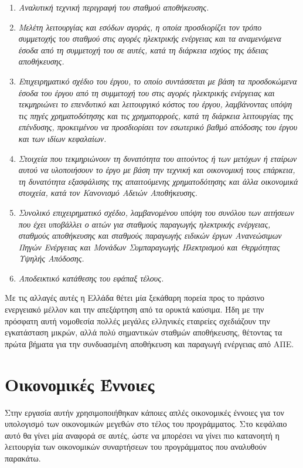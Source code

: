 \documentclass[12pt]{report}
\begin{document}
\begin{enumerate}[label=\roman*.]
	\item {\textit{Αναλυτική τεχνική περιγραφή του σταθμού αποθήκευσης.}}
	\item {\textit{Μελέτη λειτουργίας και εσόδων αγοράς, η οποία προσδιορίζει τον τρόπο συμμετοχής του σταθμού στις αγορές ηλεκτρικής ενέργειας και τα αναμενόμενα έσοδα από τη συμμετοχή του σε αυτές, 
				κατά τη διάρκεια ισχύος της άδειας αποθήκευσης.}}
	\item {\textit{Επιχειρηματικό σχέδιο του έργου, το οποίο συντάσσεται με βάση τα προσδοκώμενα έσοδα του έργου από τη συμμετοχή του στις αγορές ηλεκτρικής ενέργειας και τεκμηριώνει το επενδυτικό και λειτουργικό κόστος του έργου, 
				λαμβάνοντας υπόψη τις πηγές χρηματοδότησης και τις χρηματορροές, κατά τη διάρκεια λειτουργίας της επένδυσης, προκειμένου να προσδιορίσει τον εσωτερικό βαθμό απόδοσης του έργου και των ιδίων κεφαλαίων.}}
	\item {\textit{Στοιχεία που τεκμηριώνουν τη δυνατότητα του αιτούντος ή των μετόχων ή εταίρων αυτού να υλοποιήσουν το έργο με βάση την τεχνική και οικονομική τους επάρκεια, τη δυνατότητα εξασφάλισης της απαιτούμενης χρηματοδότησης 
				και άλλα οικονομικά στοιχεία, κατά τον Κανονισμό Αδειών Αποθήκευσης.}}
	\item {\textit{Συνολικό επιχειρηματικό σχέδιο, λαμβανομένου υπόψη του συνόλου των αιτήσεων που έχει υποβάλλει ο αιτών για σταθμούς παραγωγής ηλεκτρικής ενέργειας, σταθμούς αποθήκευσης και σταθμούς παραγωγής ειδικών έργων 
				Ανανεώσιμων Πηγών Ενέργειας και Μονάδων Συμπαραγωγής Ηλεκτρισμού και Θερμότητας Υψηλής Απόδοσης.}}
	\item {\textit{Αποδεικτικό κατάθεσης του εφάπαξ τέλους.}}
\end{enumerate}

Με τις αλλαγές αυτές η Ελλάδα θέτει μία ξεκάθαρη πορεία προς το πράσινο ενεργειακό μέλλον και την απεξάρτηση από τα ορυκτά καύσιμα. Ήδη με την
πρόσφατη αυτή νομοθεσία πολλές μεγάλες ελληνικές εταιρείες σχεδιάζουν την εγκατάσταση μικρών, αλλά πολύ σημαντικών σταθμών αποθήκευσης, θέτοντας τα πρώτα βήματα για την συνδυασμένη αποθήκευση και παραγωγή ενέργειας από ΑΠΕ.

\pagebreak
\section*{Οικονομικές Έννοιες}
Στην εργασία αυτήν χρησιμοποιήθηκαν κάποιες απλές οικονομικές έννοιες για τον υπολογισμό των οικονομικών μεγεθών στο τέλος του προγράμματος. Στο κεφάλαιο αυτό θα γίνει μία αναφορά σε αυτές, ώστε να μπορέσει να γίνει πιο κατανοητή η 
λειτουργία των οικονομικών συναρτήσεων του προγράμματος που αναλυθούν παρακάτω.
\end{document}
